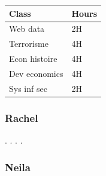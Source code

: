 \documentclass[]{article}
\begin{document}
\begin{longtable}[]{@{}ll@{}}
\toprule
\begin{minipage}[b]{0.21\columnwidth}\raggedright\strut
Class\strut
\end{minipage} & \begin{minipage}[b]{0.21\columnwidth}\raggedright\strut
Hours\strut
\end{minipage}\tabularnewline
\midrule
\endhead
\begin{minipage}[t]{0.21\columnwidth}\raggedright\strut
Web data\strut
\end{minipage} & \begin{minipage}[t]{0.21\columnwidth}\raggedright\strut
2H\strut
\end{minipage}\tabularnewline
\begin{minipage}[t]{0.21\columnwidth}\raggedright\strut
Terrorisme\strut
\end{minipage} & \begin{minipage}[t]{0.21\columnwidth}\raggedright\strut
4H\strut
\end{minipage}\tabularnewline
\begin{minipage}[t]{0.21\columnwidth}\raggedright\strut
Econ histoire\strut
\end{minipage} & \begin{minipage}[t]{0.21\columnwidth}\raggedright\strut
4H\strut
\end{minipage}\tabularnewline
\begin{minipage}[t]{0.21\columnwidth}\raggedright\strut
Dev economics\strut
\end{minipage} & \begin{minipage}[t]{0.21\columnwidth}\raggedright\strut
4H\strut
\end{minipage}\tabularnewline
\begin{minipage}[t]{0.21\columnwidth}\raggedright\strut
Sys inf sec\strut
\end{minipage} & \begin{minipage}[t]{0.21\columnwidth}\raggedright\strut
2H\strut
\end{minipage}\tabularnewline
\bottomrule
\end{longtable}

\subsubsection{Rachel}\label{rachel}

. . . .

\subsubsection{Neila}\label{neila}
\end{document}
